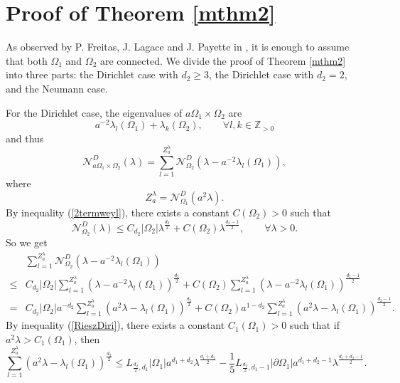 \documentclass[11pt,letterpaper]{amsart}
\numberwithin{equation}{section}
\theoremstyle{plain}
\theoremstyle{plain}
\numberwithin{equation}{section}
\theoremstyle{remark}
\begin{document}
	
	\section{Proof of Theorem \ref{mthm2}} \label{pfmthm2}
	
	As observed by P. Freitas, J. Lagace and J. Payette  in \cite[Proposition 3.1]{FLP}, it is enough to assume that both $\Omega_1$ and $\Omega_2$ are connected. We divide the proof  of Theorem \ref{mthm2} into three parts: the Dirichlet case with $d_2 \ge 3$, the Dirichlet case with  $d_2= 2$, and the Neumann case. 
	
	For the Dirichlet case,  the eigenvalues of $a\Omega_1 \times \Omega_2$ are 
	\[
	a^{-2}\lambda_l(\Omega_1)+ \lambda_k(\Omega_2), \qquad \forall l,k\in \mathbb Z_{>0} 
	\]
	and thus 
	\[
	\mathcal N^D_{a\Omega_1 \times \Omega_2}(\lambda)= \sum_{l=1}^{Z^\lambda_a} \mathcal N^D_{\Omega_2}(\lambda- a^{-2}\lambda_l(\Omega_1)), 
	\]
	where
	\[
	Z^\lambda_a= \mathcal N^D_{\Omega_1} (a^2\lambda).
	\]
	By inequality (\ref{2termweyl}), there exists a constant $C(\Omega_2)>0$ such that
	\[
	\mathcal N^D_{\Omega_2} (\lambda)\leq C_{d_2} |\Omega_2| \lambda^{\frac{d_2}{2}}+ C(\Omega_2) \lambda^{\frac{d_2-1}{2}}, \qquad \forall \lambda>0.
	\]
	So we get 
	\begin{equation}\label{proddim2}
		\begin{aligned}
			&\sum_{l=1}^{Z^\lambda_a} \mathcal N^D_{\Omega_2} (\lambda- a^{-2}\lambda_l(\Omega_1))\\
			\le&C_{d_2} |\Omega_2| \sum_{l=1}^{Z^\lambda_a} (\lambda- a^{-2}\lambda_l(\Omega_1))^{\frac{d_2}{2}}+ C(\Omega_2) \sum_{l=1}^{Z^\lambda_a} (\lambda- a^{-2}\lambda_l(\Omega_1))^{\frac{d_2-1}{2}}\\
			=  &C_{d_2}|\Omega_2| a^{-d_2} \sum_{l=1}^{Z^\lambda_a} (a^2\lambda- \lambda_l(\Omega_1))^{\frac{d_2}{2}}+ C(\Omega_2) a^{1-d_2}\sum_{l=1}^{Z^\lambda_a} (a^2\lambda- \lambda_l(\Omega_1))^{\frac{d_2-1}{2}}.
		\end{aligned}
	\end{equation}
	By inequality (\ref{RieszDiri}), there exists a constant $C_1(\Omega_1)>0$ such that if $a^2\lambda> C_1(\Omega_1)$, then 
	\begin{equation}\label{FLinequ}
		\sum_{l=1}^{Z^\lambda_a} (a^2\lambda- \lambda_l(\Omega_1))^{\frac{d_2}{2}}\le L_{\frac{d_2}{2},d_1} |\Omega_1| a^{d_1+d_2} \lambda^{\frac{d_1+d_2}{2}}- \frac{1}{5} L_{\frac{d_2}{2}, d_1-1} |\partial \Omega_1| a^{d_1+d_2-1} \lambda^{\frac{d_1+d_2-1}{2}}.
	\end{equation}
	
\end{document}
